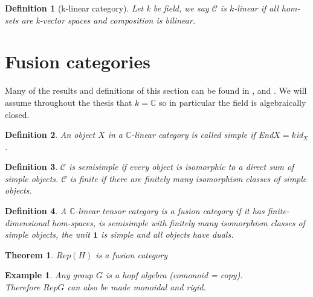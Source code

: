 \documentclass{article}
\newtheorem{definition}{Definition}
\newtheorem{example}{Example}
\newtheorem{theorem}{Theorem}
\begin{document}
	\begin{definition}[k-linear category]
	Let k be field, we say $\mathcal{C}$ is $k$-linear if all hom-sets are k-vector spaces and composition is bilinear.
	\end{definition}
	
	\section{Fusion categories}
	Many of the results and definitions  of this section can be found in \cite{Mueger08}, \cite{Bartlett15} and \cite{Freyd66}.
	We will assume throughout the thesis that $k=\mathbb{C}$ so in particular the field is algebraically closed. 
	\begin{definition}
		An object $X$ in a $\mathbb{C}$-linear category is called simple if End$X=k$id$_X$.
	\end{definition}
	\begin{definition}
		$\mathcal{C}$ is semisimple if every object is isomorphic to a direct sum of simple objects. $\mathcal{C}$ is finite if there are finitely many isomorphism classes of simple objects.
	\end{definition}
	\begin{definition}
		A $\mathbb{C}$-linear tensor category is a fusion category if it has finite-dimensional hom-spaces, is semisimple with finitely many isomorphism classes of simple objects, the unit $\mathbf{1}$ is simple  and all objects have duals.
	\end{definition}
	
	\begin{theorem}
		$Rep(H)$ is a fusion category
	\end{theorem}
	
	\begin{example}
		Any group $G$ is a hopf algebra (comonoid = copy).\\
		Therefore $RepG$ can also be made monoidal and rigid.
	\end{example}
	
\end{document}
